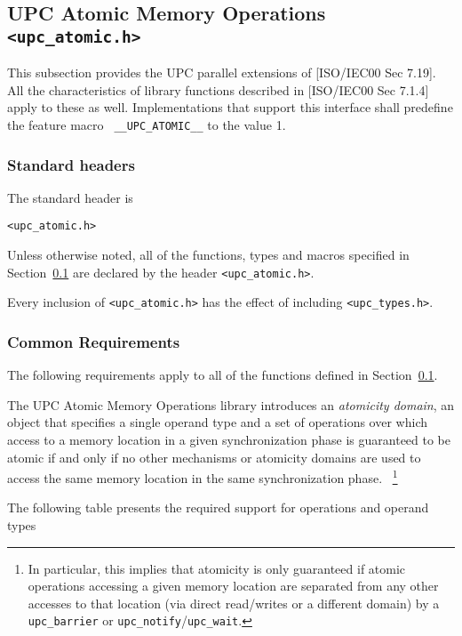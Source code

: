 \subsection{UPC Atomic Memory Operations {\tt <upc\_atomic.h>}}
\label{upc-atomic}

\npf This subsection provides the UPC parallel extensions of [ISO/IEC00 
    Sec 7.19].  All the characteristics of library functions described
    in [ISO/IEC00 Sec 7.1.4] apply to these as well.  Implementations
    that support this interface shall predefine the feature macro {\tt
    \_\_UPC\_ATOMIC\_\_} to the value 1.

\subsubsection{Standard headers}

\np The standard header is

{\tt <upc\_atomic.h>}

\np Unless otherwise noted, all of the functions, types and macros specified
    in Section~\ref{upc-atomic} are declared by the header {\tt <upc\_atomic.h>}.

\np Every inclusion of {\tt <upc\_atomic.h>} has the effect of including
    {\tt <upc\_types.h>}.

\subsubsection{Common Requirements}
\label{upc-atomic-reqs}
\npf The following requirements apply to all of the functions defined
     in Section~\ref{upc-atomic}.

\np The UPC Atomic Memory Operations library introduces an
    \emph{atomicity domain}, an object that specifies a single operand type and
    a set of operations over which access to a memory location in a given
    synchronization phase is guaranteed to be atomic if and only if no other
    mechanisms or atomicity domains are used to access the same memory
    location in the same synchronization phase.~%
    \footnote{In particular, this implies that atomicity is only guaranteed
    if atomic operations accessing a given memory location are separated from any 
    other accesses to that location (via direct read/writes or a different domain) 
    by a {\tt upc\_barrier} or {\tt upc\_notify}/{\tt upc\_wait}.}

\np The following table presents the required support for operations and
    operand types

